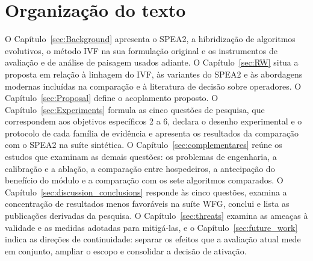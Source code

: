 \section{Organização do texto}
\label{sec:organizacao}

O Capítulo~\ref{sec:Background} apresenta o SPEA2, a hibridização de algoritmos evolutivos, o método IVF na sua formulação original e os instrumentos de avaliação e de análise de paisagem usados adiante. O Capítulo~\ref{sec:RW} situa a proposta em relação à linhagem do IVF, às variantes do SPEA2 e às abordagens modernas incluídas na comparação e à literatura de decisão sobre operadores. O Capítulo~\ref{sec:Proposal} define o acoplamento proposto. O Capítulo~\ref{sec:Experiments} formula as cinco questões de pesquisa, que correspondem aos objetivos específicos 2 a 6, declara o desenho experimental e o protocolo de cada família de evidência e apresenta os resultados da comparação com o SPEA2 na suíte sintética. O Capítulo~\ref{sec:complementares} reúne os estudos que examinam as demais questões: os problemas de engenharia, a calibração e a ablação, a comparação entre hospedeiros, a antecipação do benefício do módulo e a comparação com os sete algoritmos comparados. O Capítulo~\ref{sec:discussion_conclusions} responde às cinco questões, examina a concentração de resultados menos favoráveis na suíte WFG, conclui e lista as publicações derivadas da pesquisa. O Capítulo~\ref{sec:threats} examina as ameaças à validade e as medidas adotadas para mitigá-las, e o Capítulo~\ref{sec:future_work} indica as direções de continuidade: separar os efeitos que a avaliação atual mede em conjunto, ampliar o escopo e consolidar a decisão de ativação.

